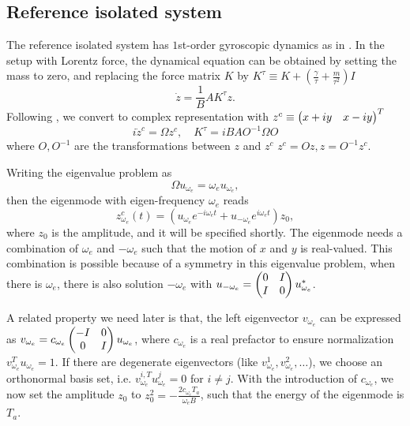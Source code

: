 \documentclass[
 amsmath,amssymb,
 aps,
 pre,
 longbibliography,
 10pt, onecolumn,
 notitlepage
]{revtex4-1}
\begin{document}
\subsection{Reference isolated system}
The reference isolated system has $1$st-order gyroscopic dynamics as in \cite{Nash2015TopologicalMechanics}. In the setup with Lorentz force, the dynamical equation can be obtained by setting the mass to zero, and replacing the force matrix $K$ by $K^\tau \equiv K + (\frac{\gamma}{\tau} + \frac{m}{\tau^2})I$
\begin{equation}
    \dot{z} = \frac{1}{B} A K^\tau z.
\end{equation}
Following \cite{Nash2015TopologicalMechanics}, we convert to complex representation with $z^c \equiv \pmqty{x + iy & x - iy}^T$
\begin{equation}
i \dot{z}^c = \Omega z^c,\quad
K^\tau = i B A O^{-1} \Omega O
\end{equation}
where $O,O^{-1}$ are the transformations between $z$ and $z^c$ $z^c = Oz, z = O^{-1}z^c$.

Writing the eigenvalue problem as
\begin{equation}
\Omega u_{\omega_e} = \omega_e u_{\omega_e} ,
\end{equation}
then the eigenmode with eigen-frequency $\omega_e$ reads
\begin{equation} \label{eqnS:mode_zct}
z^c_{\omega_e}(t) =  (u_{\omega_e} e^{-i\omega_e t} + u_{-\omega_e} e^{i\omega_e t})z_0 ,
\end{equation}
where $z_0$ is the amplitude, and it will be specified shortly.
The eigenmode needs a combination of $\omega_e$ and $-\omega_e$ such that the motion of $x$ and $y$ is real-valued.
This combination is possible because of a symmetry in this eigenvalue problem, when there is $\omega_e$, there is also solution $-\omega_e$ with $u_{-\omega_e} = \pmqty{ 0 & I \\ I & 0 } u_{\omega_e}^*$.

A related property we need later is that, the left eigenvector $v_{\omega_e}$ can be expressed as $v_{\omega_e} = c_{\omega_e} \pmqty{ -I & 0 \\ 0 & I } u_{\omega_e}$,
where $c_{\omega_e}$ is a real prefactor to ensure normalization $v_{\omega_e}^T u_{\omega_e} = 1$.
If there are degenerate eigenvectors (like $v_{\omega_e}^{1},v_{\omega_e}^{2},\dots$), we choose an orthonormal basis set, i.e. $v_{\omega_e}^{i,T} u_{\omega_e}^{j} = 0$ for $i \neq j$.
With the introduction of $c_{\omega_e}$, we now set the amplitude $z_0$ to
$z_0^2 = -\frac{2 c_{\omega_e} T_a}{\omega_e B}$, such that the energy of the eigenmode is $T_a$.
\end{document}
